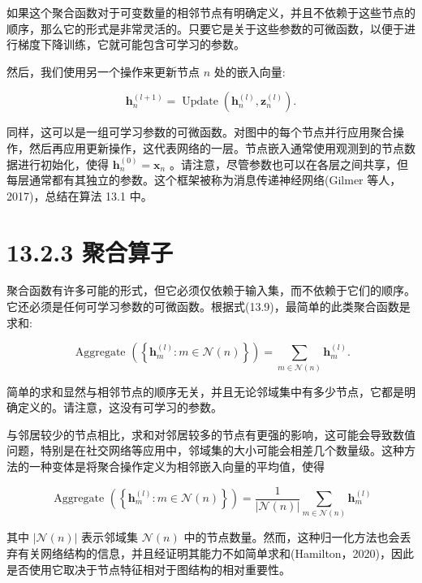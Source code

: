 \documentclass[10pt]{report}
\begin{document}
如果这个聚合函数对于可变数量的相邻节点有明确定义，并且不依赖于这些节点的顺序，那么它的形式是非常灵活的。只要它是关于这些参数的可微函数，以便于进行梯度下降训练，它就可能包含可学习的参数。

然后，我们使用另一个操作来更新节点 \(n\) 处的嵌入向量:

\[
{\mathbf{h}}_{n}^{\left( l + 1\right) } = \operatorname{Update}\left( {{\mathbf{h}}_{n}^{\left( l\right) },{\mathbf{z}}_{n}^{\left( l\right) }}\right) . \tag{13.11}
\]

同样，这可以是一组可学习参数的可微函数。对图中的每个节点并行应用聚合操作，然后再应用更新操作，这代表网络的一层。节点嵌入通常使用观测到的节点数据进行初始化，使得 \({\mathbf{h}}_{n}^{\left( 0\right) } = {\mathbf{x}}_{n}\) 。请注意，尽管参数也可以在各层之间共享，但每层通常都有其独立的参数。这个框架被称为消息传递神经网络(Gilmer 等人，2017)，总结在算法 13.1 中。

\section*{13.2.3 聚合算子}

聚合函数有许多可能的形式，但它必须仅依赖于输入集，而不依赖于它们的顺序。它还必须是任何可学习参数的可微函数。根据式(13.9)，最简单的此类聚合函数是求和:

\[
\text{ Aggregate }\left( \left\{  {{\mathbf{h}}_{m}^{\left( l\right) } : m \in  \mathcal{N}\left( n\right) }\right\}  \right)  = \mathop{\sum }\limits_{{m \in  \mathcal{N}\left( n\right) }}{\mathbf{h}}_{m}^{\left( l\right) }. \tag{13.12}
\]

简单的求和显然与相邻节点的顺序无关，并且无论邻域集中有多少节点，它都是明确定义的。请注意，这没有可学习的参数。

与邻居较少的节点相比，求和对邻居较多的节点有更强的影响，这可能会导致数值问题，特别是在社交网络等应用中，邻域集的大小可能会相差几个数量级。这种方法的一种变体是将聚合操作定义为相邻嵌入向量的平均值，使得

\[
\text{ Aggregate }\left( \left\{  {{\mathbf{h}}_{m}^{\left( l\right) } : m \in  \mathcal{N}\left( n\right) }\right\}  \right)  = \frac{1}{\left| \mathcal{N}\left( n\right) \right| }\mathop{\sum }\limits_{{m \in  \mathcal{N}\left( n\right) }}{\mathbf{h}}_{m}^{\left( l\right) } \tag{13.13}
\]

其中 \(\left| {\mathcal{N}\left( n\right) }\right|\) 表示邻域集 \(\mathcal{N}\left( n\right)\) 中的节点数量。然而，这种归一化方法也会丢弃有关网络结构的信息，并且经证明其能力不如简单求和(Hamilton，2020)，因此是否使用它取决于节点特征相对于图结构的相对重要性。
\end{document}

